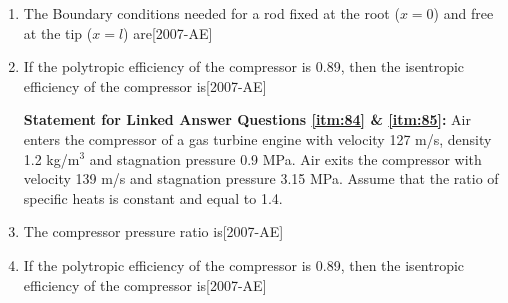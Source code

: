 \documentclass[journal]{IEEEtran}
\begin{document}
\begin{enumerate}
    \item The Boundary conditions needed for a rod fixed at the root ($x=0$) and free at the tip ($x=l$) are\label{itm:82}\hfill{[2007-AE]}
  \begin{enumerate}
  \end{enumerate}
  \item If the polytropic efficiency of the compressor is 0.89, then the isentropic efficiency of the compressor is\label{itm:83}\hfill{[2007-AE]}
  \begin{enumerate}
  \end{enumerate}



\textbf{Statement for Linked Answer Questions \ref{itm:84} \& \ref{itm:85}:} Air enters the compressor of a gas turbine engine with velocity 127 m/s, density 1.2 kg/m$^3$ and stagnation pressure 0.9 MPa. Air exits the compressor with velocity 139 m/s and stagnation pressure 3.15 MPa. Assume that the ratio of specific heats is constant and equal to 1.4.
  \item The compressor pressure ratio is\label{itm:84}\hfill{[2007-AE]}
  \begin{enumerate}
  \end{enumerate}
  \item If the polytropic efficiency of the compressor is 0.89, then the isentropic efficiency of the compressor is\label{itm:85}\hfill{[2007-AE]}
  \begin{enumerate}
  \end{enumerate}
\end{enumerate}
\end{document}
